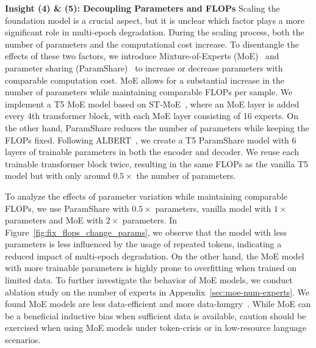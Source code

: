 \documentclass{article}
\newcommand{\ie}{\emph{i.e.,}\xspace}
\begin{document}
\textbf{Insight (4) \& (5): Decoupling Parameters and FLOPs} Scaling the foundation model is a crucial aspect, but it is unclear which factor plays a more significant role in multi-epoch degradation. During the scaling process, both the number of parameters and the computational cost increase. To disentangle the effects of these two factors, we introduce Mixture-of-Experts (MoE)~\citep{lepikhin2020gshard} and parameter sharing (ParamShare)~\citep{dehghani2018universal} to increase or decrease parameters with comparable computation cost. 
MoE allows for a substantial increase in the number of parameters while maintaining comparable FLOPs per sample. We implement a T5 MoE model based on ST-MoE~\citep{zoph2022st}, where an MoE layer is added every 4th transformer block, with each MoE layer consisting of 16 experts. 
On the other hand, ParamShare reduces the number of parameters while keeping the FLOPs fixed. Following ALBERT~\cite{lan2019albert}, we create a T5 ParamShare model with 6 layers of trainable parameters in both the encoder and decoder. We reuse each trainable transformer block twice, resulting in the same FLOPs as the vanilla T5 model but with only around $0.5\times$ the number of parameters.

To analyze the effects of parameter variation while maintaining comparable FLOPs, we use ParamShare with $0.5\times$ parameters, vanilla model with $1\times$ parameters and MoE with $2\times$ parameters. In Figure~\ref{fig:fix_flops_change_params}, we observe that the model with less parameters is less influenced by the usage of repeated tokens, indicating a reduced impact of multi-epoch degradation. On the other hand, the MoE model with more trainable parameters is highly prone to overfitting when trained on limited data. To further investigate the behavior of MoE models, we conduct ablation study on the number of experts in Appendix~\ref{sec:moe-num-experts}. We found MoE models are less data-efficient and more data-hungry~\citep{lou2021cross,kim2021scalable,xue2022go,xue2022one}. While MoE can be a beneficial inductive bias when sufficient data is available, caution should be exercised when using MoE models under token-crisis or in low-resource language scenarios.


\end{document}

